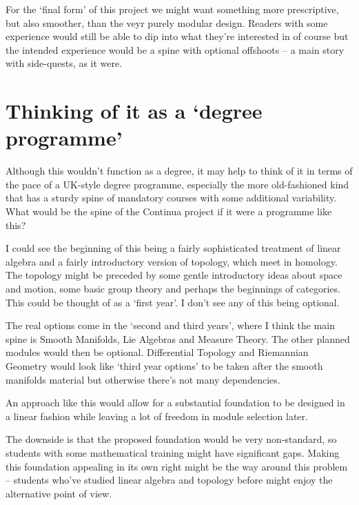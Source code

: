 \documentclass[oneside,english]{amsbook}
\numberwithin{section}{chapter}
\theoremstyle{plain}
\theoremstyle{definition}
\begin{document}
		For the `final form' of this project we might want something more prescriptive, but also smoother, than the veyr purely modular design. Readers with some experience would still be able to dip into what they're interested in of course but the intended experience would be a spine with optional offshoots -- a main story with side-quests, as it were.
		
	\section{Thinking of it as a `degree programme'}
	
		Although this wouldn't function as a degree, it may help to think of it in terms of the pace of a UK-style degree programme, especially the more old-fashioned kind that has a sturdy spine of mandatory courses with some additional variability. What would be the spine of the Continua project if it were a programme like this?
	
		I could see the beginning of this being a fairly sophisticated treatment of linear algebra and a fairly introductory version of topology, which meet in homology. The topology might be preceded by some gentle introductory ideas about space and motion, some basic group theory and perhaps the beginnings of categories. This could be thought of as a `first year'. I don't see any of this being optional.
		
		The real options come in the `second and third years', where I think the main spine is Smooth Manifolds, Lie Algebras and Measure Theory. The other planned modules would then be optional. Differential Topology and Riemannian Geometry would look like `third year options' to be taken after the smooth manifolds material but otherwise there's not many dependencies.
		
		An approach like this would allow for a substantial foundation to be designed in a linear fashion while leaving a lot of freedom in module selection later. 
		
		The downside is that the proposed foundation would be very non-standard, so students with some mathematical training might have significant gaps. Making this foundation appealing in its own right might be the way around this problem -- students who've studied linear algebra and topology before might enjoy the alternative point of view.
	
\end{document}
